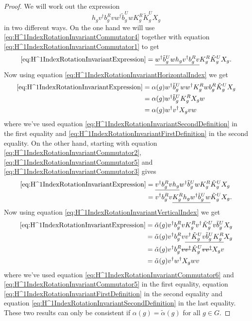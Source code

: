 \documentclass[12pt,a4paper,twoside]{article}
\numberwithin{equation}{section}
\begin{document}
\begin{proof}
	We will work out the expression
	\begin{equation}\label{eq:H^1IndexRotationInvariantExpression}
		h_g v^\dagger b_g^R v w^\dagger\tilde{b}_g^U w K_g^R\tilde{K}_g^U X_g
	\end{equation}
	in two different ways. On the one hand we will use \eqref{eq:H^1IndexRotationInvariantCommutator4} together with equation \eqref{eq:H^1IndexRotationInvariantCommutator1} to get
	\begin{equation}
		\eqref{eq:H^1IndexRotationInvariantExpression}= \underline{w^\dagger\tilde{b}_g^U w h_g v^\dagger b_g^R v} K_g^R\tilde{K}_g^U X_g.
	\end{equation}
	Now using equation \eqref{eq:H^1IndexRotationInvariantHorizontalIndex} we get
	\begin{align}
		\eqref{eq:H^1IndexRotationInvariantExpression}&=\alpha(g)w^\dagger\tilde{b}_g^U w w^\dagger K_g^R w b_g^R\tilde{K}_g^U X_g\\
		&=\alpha(g)w^\dagger\tilde{b}_g^U  K_g^R X_g w\\
		&=\alpha(g)w^\dagger v^\dagger X_g v w
	\end{align}
	where we've used equation \eqref{eq:H^1IndexRotationInvariantSecondDefinition} in the first equality and \eqref{eq:H^1IndexRotationInvariantFirstDefinition} in the second equality. On the other hand, starting with equation \eqref{eq:H^1IndexRotationInvariantCommutator2}, \eqref{eq:H^1IndexRotationInvariantCommutator5} and \eqref{eq:H^1IndexRotationInvariantCommutator3} gives
	\begin{align}
		\eqref{eq:H^1IndexRotationInvariantExpression}&= \underline{v^\dagger b_g^R v h_g} w^\dagger\tilde{b}_g^U w K_g^R\tilde{K}_g^U X_g\\
		&=v^\dagger b_g^R v \underline{K_g^R h_g w^\dagger\tilde{b}_g^U w} \tilde{K}_g^U X_g.
	\end{align}
	Now using equation \eqref{eq:H^1IndexRotationInvariantVerticalIndex} we get
	\begin{align}
		\eqref{eq:H^1IndexRotationInvariantExpression}&=\tilde{\alpha}(g)v^\dagger b_g^R v K_g^R v^\dagger \tilde{K}_g^U v \tilde{b}_g^U X_g\\
		&=\tilde{\alpha}(g)v^\dagger b_g^R v \underline{v^\dagger \tilde{K}_g^U v \tilde{b}_g^U K_g^R} X_g\\
		&=\tilde{\alpha}(g)v^\dagger b_g^R \stkout{v v^\dagger} \tilde{K}_g^U \stkout{v v^\dagger} X_g v\\
		&=\tilde{\alpha}(g) v^\dagger w^\dagger X_g w v
	\end{align}
	where we've used equation \eqref{eq:H^1IndexRotationInvariantCommutator6} and \eqref{eq:H^1IndexRotationInvariantCommutator5} in the first equality, equation \eqref{eq:H^1IndexRotationInvariantFirstDefinition} in the second equality and equation \eqref{eq:H^1IndexRotationInvariantSecondDefinition} in the last equality. These two results can only be consistent if $\alpha(g)=\tilde{\alpha}(g)$ for all $g\in G$.
\end{proof}
\end{document}
